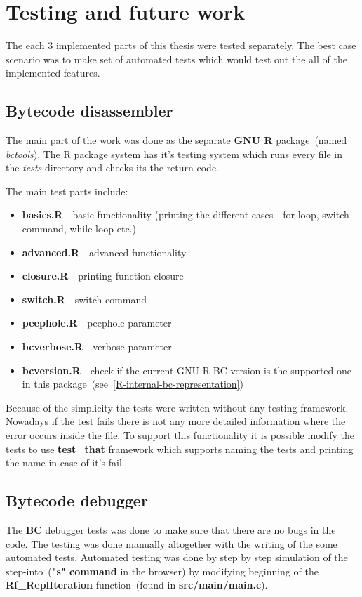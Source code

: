 \documentclass[thesis=M,english]{FITthesis}[2018/10/20]
\begin{document}
\chapter{Testing and future work}

The each 3 implemented parts of this thesis were tested separately. The best case scenario was to make set of automated tests which would test out the all of the implemented features.

\section{Bytecode disassembler}

The main part of the work was done as the separate \textbf{GNU R} package~(named \textit{bctools}). The R package system has it's testing system which runs every file in the \textit{tests} directory and checks its the return code. 

The main test parts include:
\begin{itemize}
	\item \textbf{basics.R} - basic functionality (printing the different cases - for loop, switch command, while loop etc.)
	\item \textbf{advanced.R} - advanced functionality
	\item \textbf{closure.R} - printing function closure
	\item \textbf{switch.R} - switch command
	\item \textbf{peephole.R} - peephole parameter
	\item \textbf{bcverbose.R} - verbose parameter
	\item \textbf{bcversion.R} - check if the current GNU R BC version is the supported one in this package~(see~\ref{R-internal-bc-representation})
\end{itemize}

Because of the simplicity the tests were written without any testing framework. Nowadays if the test fails there is not any more detailed information where the error occurs inside the file. To support this functionality it is possible modify the tests to use \textbf{test{\_}that} framework which supports naming the tests and printing the name in case of it's fail. 

\section{Bytecode debugger}

The \textbf{BC} debugger tests was done to make sure that there are no bugs in the code. The testing was done manually altogether with the writing of the some automated tests. Automated testing was done by step by step simulation of the step-into~(\textbf{"s" command} in the browser) by modifying beginning of the \textbf{Rf{\_}ReplIteration} function~(found in \textbf{src/main/main.c}). 
\end{document}
